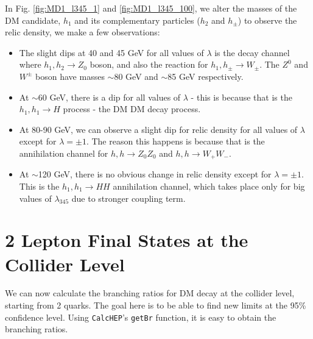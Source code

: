 \documentclass[12pt]{article}
\begin{document}
In Fig. \ref{fig:MD1_l345_1} and \ref{fig:MD1_l345_100}, we alter the masses of the DM candidate, $h_1$ and its complementary particles ($h_2$ and $h_{\pm}$) to observe the relic density, we make a few observations:
\begin{itemize}
    \item The slight dips at 40 and 45 GeV for all values of $\lambda$ is the decay channel where $h_1, h_2 \rightarrow Z_0$ boson, and also the reaction for $h_1, h_{\pm} \rightarrow W_\pm$. The $Z^0$ and $W^\pm$ boson have masses $\sim$80 GeV and $\sim$85 GeV respectively.
    \item At $\sim$60 GeV, there is a dip for all values of $\lambda$ - this is because that is the $h_1,h_1\rightarrow H$ process - the DM DM decay process. 
    \item At 80-90 GeV, we can observe a slight dip for relic density for all values of $\lambda$ except for $\lambda = \pm1$. The reason this happens is because that is the annihilation channel for $h, h \rightarrow Z_0Z_0$ and $h, h \rightarrow W_+ W_-$.
    \item At $\sim$120 GeV, there is no obvious change in relic density except for $\lambda = \pm1$. This is the $h_1,h_1\rightarrow H H$ annihilation channel, which takes place only for big values of $\lambda_{345}$ due to stronger coupling term.
\end{itemize}

\section{2 Lepton Final States at the Collider Level}
We can now calculate the branching ratios for DM decay at the collider level, starting from 2 quarks. The goal here is to be able to find new limits at the 95\% confidence level. Using \verb|CalcHEP|'s \verb|getBr| function, it is easy to obtain the branching ratios.
\end{document}
